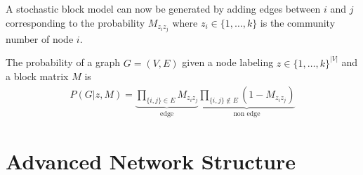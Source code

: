 \documentclass[english]{panikzettel}
\begin{document}
A stochastic block model can now be generated by adding edges between $ i $ and $ j $ corresponding to the probability $ M_{z_i z_j} $ where $ z_i \in \{1, \dots, k\} $ is the community number of node $ i $.

The probability of a graph $ G = (V,E) $ given a node labeling $ z \in \{1,\dots, k\}^{|V|} $ and a block matrix $ M $ is
\begin{align*}
	P(G | z, M) = \underbrace{\prod\limits_{\{i,j\} \in E} M_{z_i z_j}}_\text{edge} \underbrace{\prod\limits_{\{i,j\} \notin E} (1 - M_{z_i z_j})}_\text{non edge}
\end{align*}

\section{Advanced Network Structure}
\end{document}
